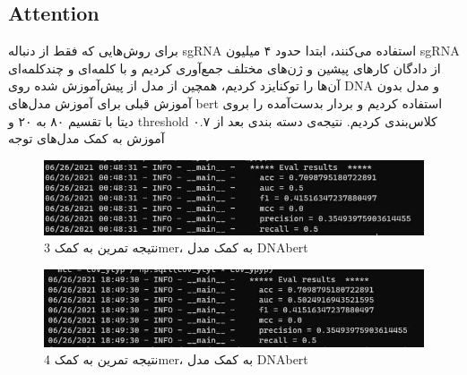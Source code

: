 \documentclass[12pt,a4paper,BCOR=.7cm,headsepline,bibliography=totoc]{report}
\begin{document}
\subsection{Attention}
برای روش‌هایی که فقط از دنباله sgRNA استفاده می‌کنند، ابتدا حدود ۴ میلیون sgRNA از دادگان کار‌های پیشین و ژن‌های مختلف جمع‌آوری کردیم و با کلمه‌ای و چندکلمه‌ای آن‌ها را توکنایزد کردیم، همچین از مدل از پیش‌آموزش شده روی DNA و مدل بدون آموزش قبلی برای آموزش مدل‌های bert استفاده کردیم و بردار بدست‌آمده را بروی دیتا با تقسیم ۸۰ به ۲۰ و threshold ۰.۷ کلاس‌بندی کردیم.
نتیجه‌ی دسته بندی بعد از آموزش به کمک مدل‌های توجه
\begin{figure}[H]
\centering
\includegraphics[width=15cm, ]{pictures/3mer.jpg}
\caption{
نتیجه تمرین به کمک 3mer، به کمک مدل DNAbert
}\label{wrap-fig:4}
\end{figure}

\begin{figure}[H]
\centering
\includegraphics[width=15cm, ]{pictures/4mer.jpg}
\caption{
نتیجه تمرین به کمک 4mer، به کمک مدل DNAbert
}\label{wrap-fig:4}
\end{figure}
\end{document}
